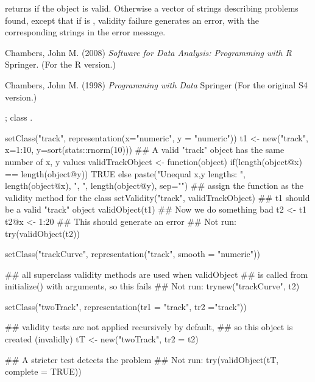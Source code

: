 %
\begin{Value}
 returns  if the object is valid.
Otherwise a vector of strings describing problems found, except that
if  is , validity failure generates an error,
with the corresponding strings in the error message.
\end{Value}
%
\begin{References}\relax
Chambers, John M. (2008)
\emph{Software for Data Analysis: Programming with R}
Springer.  (For the R version.)

Chambers, John M. (1998)
\emph{Programming with Data}
Springer (For the original S4 version.) 
\end{References}
%
\begin{SeeAlso}\relax
{};
class .
\end{SeeAlso}
%
\begin{Examples}
\begin{ExampleCode}
setClass("track",
          representation(x="numeric", y = "numeric"))
t1 <- new("track", x=1:10, y=sort(stats::rnorm(10)))
## A valid "track" object has the same number of x, y values
validTrackObject <- function(object) {
    if(length(object@x) == length(object@y)) TRUE
    else paste("Unequal x,y lengths: ", length(object@x), ", ",
               length(object@y), sep="")
}
## assign the function as the validity method for the class
setValidity("track", validTrackObject)
## t1 should be a valid "track" object
validObject(t1)
## Now we do something bad
t2 <- t1
t2@x <- 1:20
## This should generate an error
## Not run: try(validObject(t2))


setClass("trackCurve",
         representation("track", smooth = "numeric"))

## all superclass validity methods are used when validObject
## is called from initialize() with arguments, so this fails
## Not run: trynew("trackCurve", t2)


setClass("twoTrack", representation(tr1 = "track", tr2 ="track"))

## validity tests are not applied recursively by default,
## so this object is created (invalidly)
tT  <- new("twoTrack", tr2 = t2)

## A stricter test detects the problem
## Not run: try(validObject(tT, complete = TRUE))

\end{ExampleCode}
\end{Examples}
\clearpage
